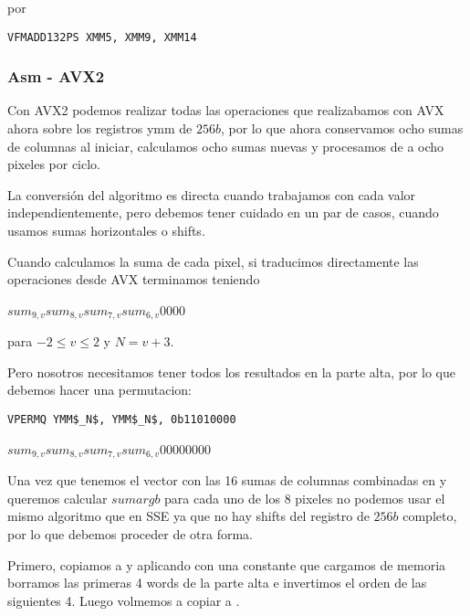 por

\begin{lstlisting}
VFMADD132PS XMM5, XMM9, XMM14
\end{lstlisting}

\subsubsection{Asm - AVX2}

Con AVX2 podemos realizar todas las operaciones que realizabamos con AVX ahora sobre los registros ymm de $256b$, por lo que ahora conservamos ocho sumas de columnas al iniciar, calculamos ocho sumas nuevas y procesamos de a ocho pixeles por ciclo.

La conversión del algoritmo es directa cuando trabajamos con cada valor independientemente, pero debemos tener cuidado en un par de casos, cuando usamos sumas horizontales o shifts.

\vspace{5mm}

Cuando calculamos la suma de cada pixel, si traducimos directamente las operaciones desde AVX terminamos teniendo

 
{$sum_{9,v}$}{$sum_{8,v}$}{$sum_{7,v}$}{$sum_{6,v}$}{0}{0}{0}{0}

para $-2 \le v \le 2$ y $N = v+3$.

Pero nosotros necesitamos tener todos los resultados en la parte alta, por lo que debemos hacer una permutacion:

\begin{lstlisting}
VPERMQ YMM$_N$, YMM$_N$, 0b11010000
\end{lstlisting}

 
{$sum_{9,v}$}{$sum_{8,v}$}{$sum_{7,v}$}{$sum_{6,v}$}{0}{0}{0}{0}{0}{0}{0}{0}

\vspace{5mm}

Una vez que tenemos el vector con las 16 sumas de columnas combinadas en  y queremos calcular $sumargb$ para cada uno de los 8 pixeles no podemos usar el mismo algoritmo que en SSE ya que no hay shifts del registro de $256b$ completo, por lo que debemos proceder de otra forma.

Primero, copiamos  a  y aplicando  con una constante que cargamos de memoria borramos las primeras 4 words de la parte alta e invertimos el orden de las siguientes 4. Luego volmemos a copiar  a . 

